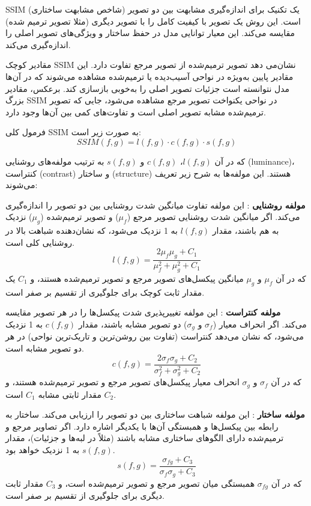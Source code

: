 SSIM
(شاخص مشابهت ساختاری) یک تکنیک برای اندازه‌گیری مشابهت بین دو تصویر است. این روش یک تصویر با کیفیت کامل را با تصویر دیگری (مثلا تصویر ترمیم شده) مقایسه می‌کند. این معیار توانایی مدل در حفظ ساختار و ویژگی‌های تصویر اصلی را اندازه‌گیری می‌کند.

مقادیر کوچک SSIM نشان‌می دهد تصویر ترمیم‌شده از تصویر مرجع تفاوت دارد. این مقادیر پایین به‌ویژه در نواحی آسیب‌دیده یا ترمیم‌شده مشاهده می‌شوند که در آن‌ها مدل نتوانسته است جزئیات تصویر اصلی را به‌خوبی بازسازی کند. برعکس، مقادیر بزرگ SSIM در نواحی یکنواخت تصویر مرجع مشاهده می‌شود، جایی که تصویر ترمیم‌شده مشابه تصویر اصلی است و تفاوت‌های کمی بین آن‌ها وجود دارد.

فرمول کلی SSIM به صورت زیر است:
$$
SSIM(f, g) = l(f, g) \cdot c(f, g) \cdot s(f, g)
$$

که در آن $l(f, g)$، $c(f, g)$ و $s(f, g)$ به ترتیب مولفه‌های روشنایی (luminance)، کنتراست (contrast) و ساختار (structure) هستند. این مولفه‌ها به شرح زیر تعریف می‌شوند:

\textbf{مولفه روشنایی}%
: این مولفه تفاوت میانگین شدت روشنایی بین دو تصویر را اندازه‌گیری می‌کند. اگر میانگین شدت روشنایی تصویر مرجع ($\mu_f$) و تصویر ترمیم‌شده ($\mu_g$) نزدیک به هم باشند، مقدار $l(f, g)$ به 1 نزدیک می‌شود، که نشان‌دهنده شباهت بالا در روشنایی کلی است.
$$
l(f, g) = \frac{2\mu_f \mu_g + C_1}{\mu_f^2 + \mu_g^2 + C_1}
$$
که در آن $\mu_f$ و $\mu_g$ میانگین پیکسل‌های تصویر مرجع و تصویر ترمیم‌شده هستند، و $C_1$ یک مقدار ثابت کوچک برای جلوگیری از تقسیم بر صفر است.

\textbf{مولفه کنتراست}%
:    این مولفه تغییرپذیری شدت پیکسل‌ها را در هر تصویر مقایسه می‌کند. اگر انحراف معیار ($\sigma_f$ و $\sigma_g$) دو تصویر مشابه باشند، مقدار $c(f, g)$ به 1 نزدیک می‌شود، که نشان می‌دهد کنتراست (تفاوت بین روشن‌ترین و تاریک‌ترین نواحی) در هر دو تصویر مشابه است.
$$
c(f, g) = \frac{2\sigma_f \sigma_g + C_2}{\sigma_f^2 + \sigma_g^2 + C_2}
$$
که در آن $\sigma_f$ و $\sigma_g$ انحراف معیار پیکسل‌های تصویر مرجع و تصویر ترمیم‌شده هستند، و $C_2$ مقدار ثابتی مشابه $C_1$ است.

\textbf{مولفه ساختار}
: این مولفه شباهت ساختاری بین دو تصویر را ارزیابی می‌کند. ساختار به رابطه بین پیکسل‌ها و همبستگی آن‌ها با یکدیگر اشاره دارد. اگر تصاویر مرجع و ترمیم‌شده دارای الگوهای ساختاری مشابه باشند (مثلاً در لبه‌ها و جزئیات)، مقدار $s(f, g)$ به 1 نزدیک خواهد بود.
$$
s(f, g) = \frac{\sigma_{fg} + C_3}{\sigma_f \sigma_g + C_3}
$$
که در آن $\sigma_{fg}$ همبستگی میان تصویر مرجع و تصویر ترمیم‌شده است، و $C_3$ مقدار ثابت دیگری برای جلوگیری از تقسیم بر صفر است.

